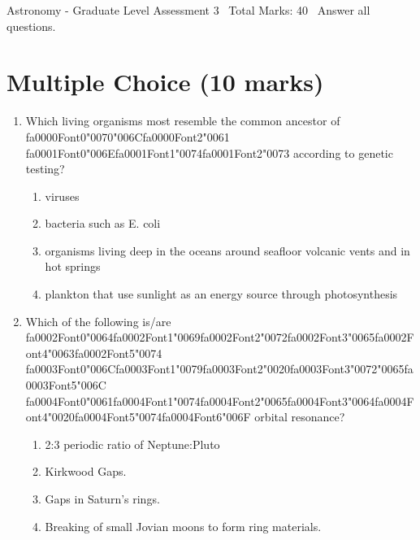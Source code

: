 \documentclass[12pt]{article}
\begin{document}
\begin{center}
Astronomy - Graduate Level Assessment 3 \
Total Marks: 40 \
Answer all questions.
\end{center}

\section*{Multiple Choice (10 marks)}
\begin{enumerate}[label=\arabic*.]
\item Which living organisms most resemble the common ancestor of {\csname fa0000Font0\endcsname\char"0070}{\char"006C}{\csname fa0000Font2\endcsname\char"0061} {\csname fa0001Font0\endcsname\char"006E}{\csname fa0001Font1\endcsname\char"0074}{\csname fa0001Font2\endcsname\char"0073} according to genetic
testing?
\begin{enumerate}[label=(\alph*)]
    \item viruses
    \item bacteria such as E. coli
    \item organisms living deep in the oceans around seafloor volcanic vents and in hot springs
    \item plankton that use sunlight as an energy source through photosynthesis
\end{enumerate}
\item Which of the following is/are {\csname fa0002Font0\endcsname\char"0064}{\csname fa0002Font1\endcsname\char"0069}{\csname fa0002Font2\endcsname\char"0072}{\csname fa0002Font3\endcsname\char"0065}{\csname fa0002Font4\endcsname\char"0063}{\csname fa0002Font5\endcsname\char"0074} {\csname fa0003Font0\endcsname\char"006C}{\csname fa0003Font1\endcsname\char"0079}{\csname fa0003Font2\endcsname\char"0020}{\csname fa0003Font3\endcsname\char"0072}{\char"0065}{\csname fa0003Font5\endcsname\char"006C} {\csname fa0004Font0\endcsname\char"0061}{\csname fa0004Font1\endcsname\char"0074}{\csname fa0004Font2\endcsname\char"0065}{\csname fa0004Font3\endcsname\char"0064}{\csname fa0004Font4\endcsname\char"0020}{\csname fa0004Font5\endcsname\char"0074}{\csname fa0004Font6\endcsname\char"006F} orbital resonance?
\begin{enumerate}[label=(\alph*)]
    \item 2:3 periodic ratio of Neptune:Pluto
    \item Kirkwood Gaps.
    \item Gaps in Saturn's rings.
    \item Breaking of small Jovian moons to form ring materials.

\end{enumerate}
\end{enumerate}
\end{document}

